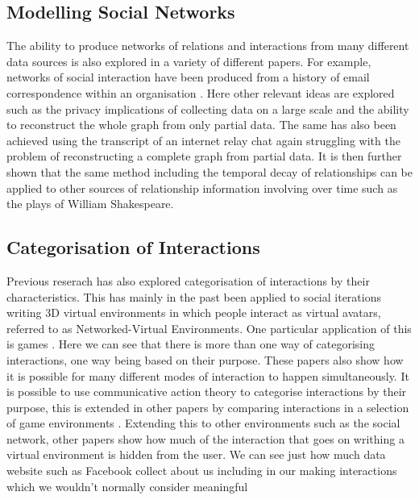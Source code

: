 \documentclass[12pt,a4paper]{article}
\begin{document}
\subsection{Modelling Social Networks}
The ability to produce networks of relations and interactions from many different data sources is also explored in a variety of different papers. For example, networks of social interaction have been produced from a history of email correspondence within an organisation \cite{fisher2004social}. Here other relevant ideas are explored such as the privacy implications of collecting data on a large scale and the ability to reconstruct the whole graph from only partial data. The same has also been achieved using the transcript of an internet relay chat \cite{mutton2004inferring} again struggling with the problem of reconstructing a complete graph from partial data. It is then further shown that the same method including the temporal decay of relationships can be applied to other sources of relationship information involving over time such as the plays of William Shakespeare.

\subsection{Categorisation of Interactions}
Previous reserach has also explored categorisation of interactions by their characteristics. This has mainly in the past been applied to social iterations writing 3D virtual environments in which people interact as virtual avatars, referred to as Networked-Virtual Environments. One particular application of this is games \cite{manninen2000interaction}. Here we can see that there is more than one way of categorising interactions, one way being based on their purpose. These papers also show how it is possible for many different modes of interaction to happen simultaneously. It is possible to use communicative action theory to categorise interactions by their purpose, this is extended in other papers by comparing interactions in a selection of game environments \cite{becker2002social}. Extending this to other environments such as the social network, other papers show how much of the interaction that goes on writhing a virtual environment is hidden from the user. We can see just how much data website such as Facebook collect about us including in our making interactions which we wouldn't normally consider meaningful \cite{schneier2010taxonomy}
\end{document}
